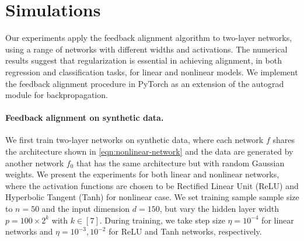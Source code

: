 \section{Simulations}

Our experiments apply the feedback alignment algorithm to two-layer networks, using a range of networks with different widths and activations. The numerical results suggest that regularization is essential in achieving alignment, in both regression and classification tasks, for linear and nonlinear models. We implement the feedback alignment procedure in PyTorch as an extension of the autograd module for backpropagation.

\paragraph{Feedback alignment on synthetic data.}

We first train two-layer networks on synthetic data, where each network $f$ shares the architecture shown in \eqref{eqn:nonlinear-network} and the data are generated by another network $f_0$ that has the same architecture but with random Gaussian weights. We present the experiments for both linear and nonlinear networks, where the activation functions are chosen to be Rectified Linear Unit (ReLU) and Hyperbolic Tangent (Tanh) for nonlinear case. We set training sample sample size to $n=50$ and the input dimension $d=150$, but vary the hidden layer width $p = 100\times 2^k$ with $k\in[7]$. During training, we take step size $\eta = 10^{-4}$ for linear networks and $\eta = 10^{-3},10^{-2}$ for ReLU and Tanh networks, respectively.


